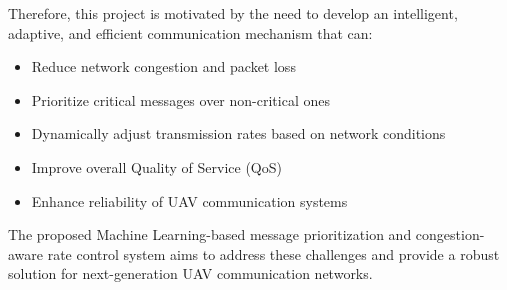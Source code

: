 Therefore, this project is motivated by the need to develop an intelligent, adaptive, and efficient communication mechanism that can:
\begin{itemize}
    \item Reduce network congestion and packet loss
    \item Prioritize critical messages over non-critical ones
    \item Dynamically adjust transmission rates based on network conditions
    \item Improve overall Quality of Service (QoS)
    \item Enhance reliability of UAV communication systems
\end{itemize}

The proposed Machine Learning-based message prioritization and congestion-aware rate control system aims to address these challenges and provide a robust solution for next-generation UAV communication networks.